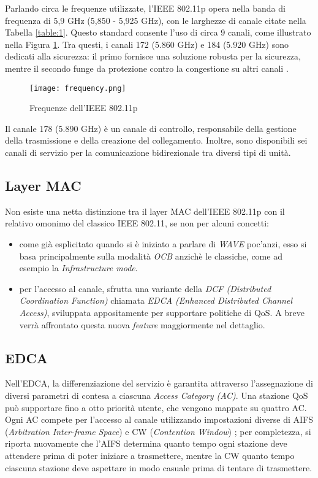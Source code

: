 Parlando circa le frequenze utilizzate, l'IEEE 802.11p opera nella banda di frequenza di 5,9 GHz (5,850 - 5,925 GHz), con le larghezze di canale citate nella Tabella \ref{table:1}. Questo standard consente l'uso di circa 9 canali, come illustrato nella Figura \ref{fig:frequency}. Tra questi, i canali 172 (5.860 GHz) e 184 (5.920 GHz) sono dedicati alla sicurezza: il primo fornisce una soluzione robusta per la sicurezza, mentre il secondo funge da protezione contro la congestione su altri canali \cite{ad_hoc_new}.

\begin{figure}[h!]
    \centering
    \texttt{[image: frequency.png]}
    \caption{Frequenze dell'IEEE 802.11p}
    \label{fig:frequency}
\end{figure}

Il canale 178 (5.890 GHz) è un canale di controllo, responsabile della gestione della trasmissione e della creazione del collegamento. Inoltre, sono disponibili sei canali di servizio per la comunicazione bidirezionale tra diversi tipi di unità.

\subsection[Layer MAC]{Layer MAC}
Non esiste una netta distinzione tra il layer MAC dell'IEEE 802.11p con il relativo omonimo del classico IEEE 802.11, se non per alcuni concetti:

\begin{itemize}
    \item come già esplicitato quando si è iniziato a parlare di \textit{WAVE} poc'anzi, esso si basa principalmente sulla modalità \textit{OCB} anzichè le classiche, come ad esempio la \textit{Infrastructure mode}.
    \item per l'accesso al canale, sfrutta una variante della \textit{DCF (Distributed Coordination Function)} chiamata \textit{EDCA (Enhanced Distributed Channel Access)}, sviluppata appositamente per supportare politiche di QoS. A breve verrà affrontato questa nuova \textit{feature} maggiormente nel dettaglio.
\end{itemize}

\subsection[EDCA]{EDCA}
\label{edca}
Nell'EDCA, la differenziazione del servizio è garantita attraverso l'assegnazione di diversi parametri di contesa a ciascuna \textit{Access Category (AC)}. Una stazione QoS può supportare fino a otto priorità utente, che vengono mappate su quattro AC. Ogni AC compete per l'accesso al canale utilizzando impostazioni diverse di AIFS (\textit{Arbitration Inter-frame Space}) e CW (\textit{Contention Window}) \cite{4024121}; per completezza, si riporta nuovamente che l'AIFS determina quanto tempo ogni stazione deve attendere prima di poter iniziare a trasmettere, mentre la CW quanto tempo ciascuna stazione deve aspettare in modo casuale prima di tentare di trasmettere.

